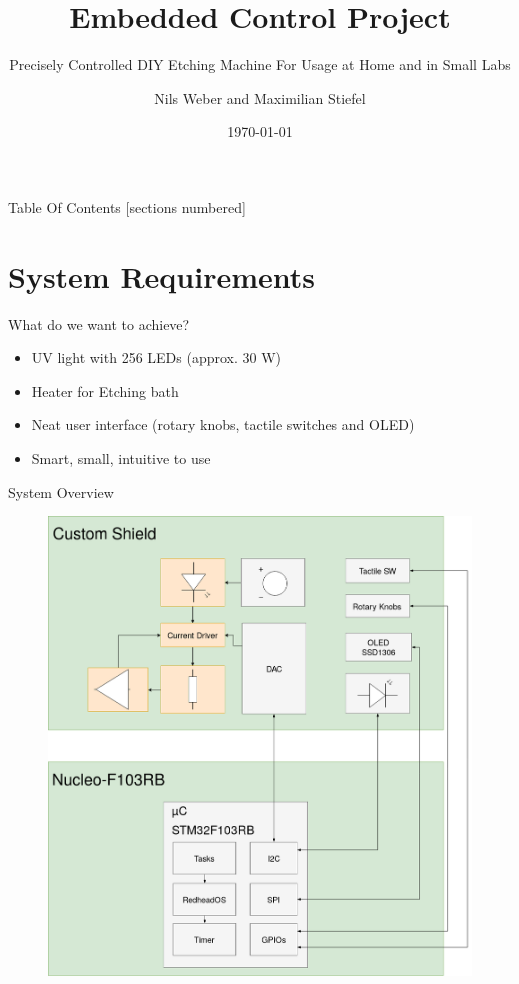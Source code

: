 \documentclass[apectratio=169]{beamer}
\title{Embedded Control Project}
\subtitle{Precisely Controlled DIY Etching Machine For Usage at Home and in Small Labs}
\date{\today}
\author{Nils Weber and Maximilian Stiefel}
\institute{Uppsala University}
\begin{document}
  \maketitle

\begin{frame}{Table Of Contents}
  [sections numbered]
  \tableofcontents[hideallsubsections]
\end{frame}
\section{System Requirements}
  	\begin{frame}{What do we want to achieve?}
		\begin{itemize}
			\item<1-> UV light with 256 LEDs (approx. 30 W)
			\item<2-> Heater for Etching bath
			\item<3-> Neat user interface (rotary knobs, tactile switches and OLED)
			\item<4-> Smart, small, intuitive to use
		\end{itemize}
  	\end{frame}
 \begin{frame}{System Overview}
 \begin{figure}
  \includegraphics[scale=0.2]{./fig/uv_light}
 \end{figure}
 \end{frame}
\end{document}
